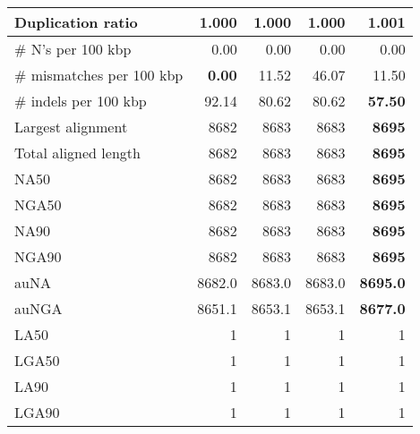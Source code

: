 \documentclass[12pt,a4paper]{article}
\begin{document}
\begin{table}[ht]
\begin{center}
\begin{tabular}{|l*{4}{|r}|}
Duplication ratio & {\bf 1.000} & {\bf 1.000} & {\bf 1.000} & 1.001 \\ \hline
\# N's per 100 kbp & 0.00 & 0.00 & 0.00 & 0.00 \\ \hline
\# mismatches per 100 kbp & {\bf 0.00} & 11.52 & 46.07 & 11.50 \\ \hline
\# indels per 100 kbp & 92.14 & 80.62 & 80.62 & {\bf 57.50} \\ \hline
Largest alignment & 8682 & 8683 & 8683 & {\bf 8695} \\ \hline
Total aligned length & 8682 & 8683 & 8683 & {\bf 8695} \\ \hline
NA50 & 8682 & 8683 & 8683 & {\bf 8695} \\ \hline
NGA50 & 8682 & 8683 & 8683 & {\bf 8695} \\ \hline
NA90 & 8682 & 8683 & 8683 & {\bf 8695} \\ \hline
NGA90 & 8682 & 8683 & 8683 & {\bf 8695} \\ \hline
auNA & 8682.0 & 8683.0 & 8683.0 & {\bf 8695.0} \\ \hline
auNGA & 8651.1 & 8653.1 & 8653.1 & {\bf 8677.0} \\ \hline
LA50 & 1 & 1 & 1 & 1 \\ \hline
LGA50 & 1 & 1 & 1 & 1 \\ \hline
LA90 & 1 & 1 & 1 & 1 \\ \hline
LGA90 & 1 & 1 & 1 & 1 \\ \hline
\end{tabular}
\end{center}
\end{table}
\end{document}
